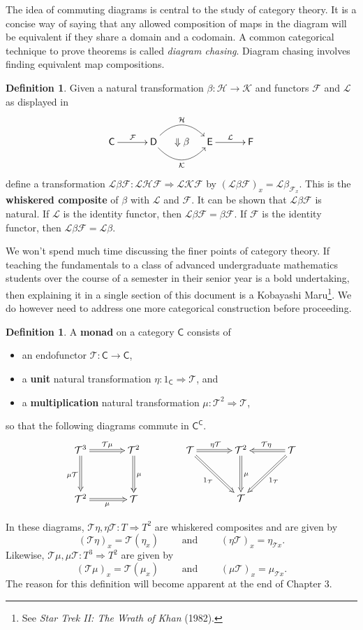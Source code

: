 \documentclass[MS, xcolor=dvipsnames]{wfuthesis}
\def\sC{\mathsf{C}}
\def\sD{\mathsf{D}}
\def\cF{\mathcal{F}}
\def\cT{\mathcal{T}}
\def\and{\text{ and }}
\theoremstyle{definition}
\newtheorem{definition}[theorem]{Definition}
\begin{document}
The idea of commuting diagrams is central to the study of category theory. It is a concise way of saying that any allowed composition of maps in the diagram will be equivalent if they share a domain and a codomain. A common categorical technique to prove theorems is called \emph{diagram chasing}. Diagram chasing involves finding equivalent map compositions. \par
\begin{definition}
  Given a natural transformation $\beta: \mathcal H \to \mathcal K$ and functors $\mathcal F$ and $\mathcal L$ as displayed in
  \[ \SelectTips{cm}{}\xymatrix@C-1pc{
    \sC \ar[0,2]^{\cF} & & \sD \ar@/^1.5pc/[0,2]^{\mathcal H} \ar@/_1.5pc/[0,2]_{\mathcal K} & \Downarrow\beta & \mathsf E \ar[0,2]^{\mathcal L} & & \mathsf F
  } \]
  define a transformation $\mathcal L \beta \mathcal F: \mathcal L \mathcal H \mathcal F \Rightarrow \mathcal L \mathcal K \mathcal F$ by $(\mathcal L \beta \mathcal F)_x = \mathcal L \beta_{\mathcal F_x}$. This is the \textbf{whiskered composite} of $\beta$ with $\mathcal L$ and $\mathcal F$. It can be shown that $\mathcal L \beta \mathcal F$ is natural. If $\mathcal L$ is the identity functor, then $\mathcal L \beta \mathcal F = \beta \mathcal F$. If $\mathcal F$ is the identity functor, then  $\mathcal L \beta \mathcal F = \mathcal L \beta$.
\end{definition}
We won't spend much time discussing the finer points of category theory. If teaching the fundamentals to a class of advanced undergraduate mathematics students over the course of a semester in their senior year is a bold undertaking, then explaining it in a single section of this document is a Kobayashi Maru\footnote{See \textit{Star Trek II: The Wrath of Khan} (1982).}. We do however need to address one more categorical construction before proceeding. 
\begin{definition}
  A \textbf{monad} on a category $\sC$ consists of
  \begin{itemize}
    \item an endofunctor $\cT: \sC \to \sC$,
    \item a \textbf{unit} natural transformation $\eta: 1_\sC \Rightarrow \cT$, and
    \item a \textbf{multiplication} natural transformation $\mu: \cT^2 \Rightarrow \cT$,
  \end{itemize}
  so that the following diagrams commute in $\sC^\sC$.
  \[ \SelectTips{cm}{}\xymatrix@R+1pc@C+1pc{
  \cT^3 \ar@{=>}[r]^{\cT\mu} \ar@{=>}[d]_{\mu \cT} & \cT^2 \ar@{=>}[d]^\mu \\ \cT^2 \ar@{=>}[r]_\mu & \cT
  } \qquad\qquad \SelectTips{cm}{}\xymatrix@R+1pc@C+1pc{
  \cT \ar@{=>}[r]^{\eta \cT} \ar@{=>}[dr]_{1_\cT} & \cT^2 \ar@{=>}[d]^\mu & \cT \ar@{=>}[l]_{\cT\eta} \ar@{=>}[dl]^{1_\cT} \\ & \cT &
  } \]
\end{definition}
In these diagrams, $\cT\eta,\eta\cT: T \Rightarrow T^2$ are whiskered composites and are given by
\[ (\cT\eta)_x = \cT(\eta_x) \qquad\and\qquad (\eta\cT)_x = \eta_{\cT x}. \]
Likewise, $\cT\mu,\mu\cT: T^3 \Rightarrow T^2$ are given by
\[ (\cT\mu)_x = \cT(\mu_x) \qquad\and\qquad (\mu\cT)_x = \mu_{\cT x}. \]
The reason for this definition will become apparent at the end of Chapter 3.
\end{document}
